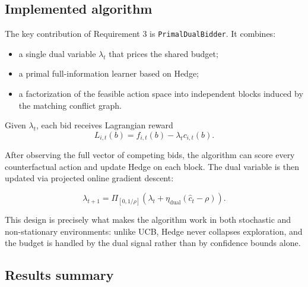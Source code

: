 \documentclass[11pt,a4paper]{article}
\begin{document}
\subsection{Implemented algorithm}

The key contribution of Requirement 3 is \texttt{PrimalDualBidder}. It combines:

\begin{itemize}
  \item a single dual variable $\lambda_t$ that prices the shared budget;
  \item a primal full-information learner based on Hedge;
  \item a factorization of the feasible action space into independent blocks
  induced by the matching conflict graph.
\end{itemize}

Given $\lambda_t$, each bid receives Lagrangian reward
\[
L_{i,t}(b) = f_{i,t}(b) - \lambda_t c_{i,t}(b).
\]

After observing the full vector of competing bids, the algorithm can score every
counterfactual action and update Hedge on each block. The dual variable is then
updated via projected online gradient descent:

\[
\lambda_{t+1}
=
\Pi_{[0,1/\rho]}
\left(\lambda_t + \eta_{\text{dual}}(\widehat c_t - \rho)\right).
\]

This design is precisely what makes the algorithm work in both stochastic and
non-stationary environments: unlike UCB, Hedge never collapses exploration, and
the budget is handled by the dual signal rather than by confidence bounds alone.

\subsection{Results summary}
\end{document}
